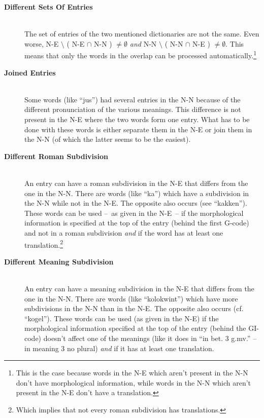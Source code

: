 \begin{description}
  \item [{\bf Different Sets Of Entries}]\hspace{1cm}\\ 
        The set of entries of the two mentioned dictionaries are not the same.
        Even worse, N-E $\setminus$ ( N-E $\cap$ N-N ) $\neq \emptyset$ 
        {\em and}   N-N $\setminus$ ( N-N $\cap$ N-E )
        $\neq \emptyset$. This means that only the words in the overlap can be 
        processed automatically.\footnote{This is the case because words 
        in the N-E which aren't present in the N-N don't have morphological 
        information, while words in the N-N which aren't present in the N-E 
        don't have a translation.}
  \item [{\bf Joined Entries}]\hspace{1cm}\\
        Some words (like ``jus'') had several entries in the N-N because of the
        different pronunciation of the various meanings. This difference is
        not present in the N-E where the two words form one entry. What has to 
        be done with these words is either separate them in the N-E or join
        them in the N-N (of which the latter seems to be the easiest).
  \item [{\bf Different Roman Subdivision}]\hspace{1cm}\\
        An entry can have a roman subdivision in the N-E that differs from the 
        one in the N-N. There are words (like ``ka'') which have a subdivision 
        in the N-N while not in the N-E. The opposite also occurs (see 
        ``kakken''). These words can be used --~as given in the N-E~-- if the 
        morphological information is specified at the top of the entry (behind 
        the first G-code) and not in a roman subdivision {\em and} if the word 
        has at 
        least one translation.\footnote{Which implies that not every roman 
        subdivision has translations.}
  \item [{\bf Different Meaning Subdivision}]\hspace{1cm}\\
        An entry can have a meaning subdivision in the N-E that differs from 
        the one in the N-N. There are words (like ``kolokwint'') which have more
        subdivisions in the N-N than in the N-E. The opposite also occurs (cf. 
        ``kogel''). These words can be used (as given in the N-E) if the 
        morphological information specified at the top of the entry (behind 
        the GI-code) doesn't affect one of the meanings (like it does in ``in 
        bet. 3 g.mv.'' -- in meaning 3 no plural) {\em and} if it has at least 
        one translation.
\end{description}
 
